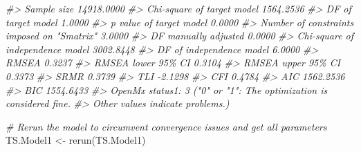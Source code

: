 \documentclass[
]{book}
\newenvironment{Shaded}{\begin{snugshade}}{\end{snugshade}}
\newcommand{\CommentTok}[1]{\textcolor[rgb]{0.56,0.35,0.01}{\textit{#1}}}
\newcommand{\FunctionTok}[1]{\textcolor[rgb]{0.00,0.00,0.00}{#1}}
\newcommand{\NormalTok}[1]{#1}
\newcommand{\OtherTok}[1]{\textcolor[rgb]{0.56,0.35,0.01}{#1}}
\begin{document}
\begin{Shaded}
\begin{Highlighting}[]
\CommentTok{\#\textgreater{} Sample size                                14918.0000}
\CommentTok{\#\textgreater{} Chi{-}square of target model                  1564.2536}
\CommentTok{\#\textgreater{} DF of target model                             1.0000}
\CommentTok{\#\textgreater{} p value of target model                        0.0000}
\CommentTok{\#\textgreater{} Number of constraints imposed on "Smatrix"     3.0000}
\CommentTok{\#\textgreater{} DF manually adjusted                           0.0000}
\CommentTok{\#\textgreater{} Chi{-}square of independence model            3002.8448}
\CommentTok{\#\textgreater{} DF of independence model                       6.0000}
\CommentTok{\#\textgreater{} RMSEA                                          0.3237}
\CommentTok{\#\textgreater{} RMSEA lower 95\% CI                             0.3104}
\CommentTok{\#\textgreater{} RMSEA upper 95\% CI                             0.3373}
\CommentTok{\#\textgreater{} SRMR                                           0.3739}
\CommentTok{\#\textgreater{} TLI                                           {-}2.1298}
\CommentTok{\#\textgreater{} CFI                                            0.4784}
\CommentTok{\#\textgreater{} AIC                                         1562.2536}
\CommentTok{\#\textgreater{} BIC                                         1554.6433}
\CommentTok{\#\textgreater{} OpenMx status1: 3 ("0" or "1": The optimization is considered fine.}
\CommentTok{\#\textgreater{} Other values indicate problems.)}

\CommentTok{\# Rerun the model to circumvent convergence issues and get all parameters}
\NormalTok{TS.Model1 }\OtherTok{\textless{}{-}} \FunctionTok{rerun}\NormalTok{(TS.Model1)}
\end{Highlighting}
\end{Shaded}
\end{document}
